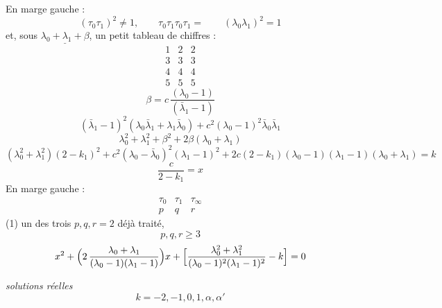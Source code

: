 \documentclass[11pt,a4paper]{article}
\begin{document}
En marge gauche :
\[
(\tau_0\tau_1)^2 \neq 1, \qquad \tau_0\tau_1\tau_0\tau_1 = \qquad (\lambda_0\lambda_1)^2 = 1
\]
et, sous $\underline{\lambda_0 + \lambda_1 + \beta}$, un petit tableau de chiffres :
\[
\begin{array}{ccc} 1 & 2 & 2\\ 3 & 3 & 3\\ 4 & 4 & 4\\ 5 & 5 & 5 \end{array}
\]
\[
\beta = c\,\frac{(\lambda_0 - 1)}{(\bar{\lambda}_1 - 1)}
\]
\[
(\bar{\lambda}_1 - 1)^2(\lambda_0\bar{\lambda}_1 + \lambda_1\bar{\lambda}_0) + c^2(\lambda_0 - 1)^2\bar{\lambda}_0\bar{\lambda}_1
\]
\[
\lambda_0^2 + \lambda_1^2 + \beta^2 + 2\beta(\lambda_0 + \lambda_1)
\]
\[
(\lambda_0^2 + \lambda_1^2)(2 - k_1)^2 + c^2(\lambda_0 - \bar{\lambda}_0)^2(\lambda_1 - 1)^2 + 2c(2 - k_1)(\lambda_0 - 1)(\lambda_1 - 1)(\lambda_0 + \lambda_1) = k
\]
\[
\frac{c}{2 - k_1} = x
\]
En marge gauche :
\[
\begin{array}{ccc} \tau_0 & \tau_1 & \tau_\infty\\ p & q & r \end{array}
\]
(1) un des trois $p, q, r = 2$ déjà traité,
\[
p, q, r \geq 3
\]
\[
x^2 + \Bigl(2\,\frac{\lambda_0 + \lambda_1}{(\lambda_0 - 1)(\lambda_1 - 1)}\Bigr)x + \Bigl[\frac{\lambda_0^2 + \lambda_1^2}{(\lambda_0 - 1)^2(\lambda_1 - 1)^2} - k\Bigr] = 0
\]

\emph{solutions réelles}
\[
k = -2, -1, 0, 1, \alpha, \alpha'
\]
\end{document}
